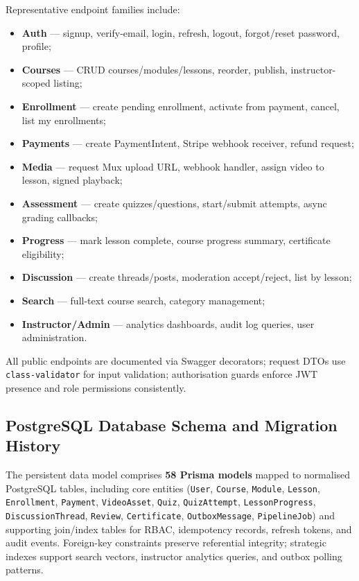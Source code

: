 Representative endpoint families include:
\begin{itemize}
  \item \textbf{Auth} --- signup, verify-email, login, refresh, logout, forgot/reset password, profile;
  \item \textbf{Courses} --- CRUD courses/modules/lessons, reorder, publish, instructor-scoped listing;
  \item \textbf{Enrollment} --- create pending enrollment, activate from payment, cancel, list my enrollments;
  \item \textbf{Payments} --- create PaymentIntent, Stripe webhook receiver, refund request;
  \item \textbf{Media} --- request Mux upload URL, webhook handler, assign video to lesson, signed playback;
  \item \textbf{Assessment} --- create quizzes/questions, start/submit attempts, async grading callbacks;
  \item \textbf{Progress} --- mark lesson complete, course progress summary, certificate eligibility;
  \item \textbf{Discussion} --- create threads/posts, moderation accept/reject, list by lesson;
  \item \textbf{Search} --- full-text course search, category management;
  \item \textbf{Instructor/Admin} --- analytics dashboards, audit log queries, user administration.
\end{itemize}

All public endpoints are documented via Swagger decorators; request DTOs use \texttt{class-validator} for input validation; authorisation guards enforce JWT presence and role permissions consistently.

\subsection{PostgreSQL Database Schema and Migration History}
\label{subsec:outcome-database}

The persistent data model comprises \textbf{58 Prisma models} mapped to normalised PostgreSQL tables, including core entities (\texttt{User}, \texttt{Course}, \texttt{Module}, \texttt{Lesson}, \texttt{Enrollment}, \texttt{Payment}, \texttt{VideoAsset}, \texttt{Quiz}, \texttt{QuizAttempt}, \texttt{LessonProgress}, \texttt{DiscussionThread}, \texttt{Review}, \texttt{Certificate}, \texttt{OutboxMessage}, \texttt{PipelineJob}) and supporting join/index tables for RBAC, idempotency records, refresh tokens, and audit events. Foreign-key constraints preserve referential integrity; strategic indexes support search vectors, instructor analytics queries, and outbox polling patterns.

